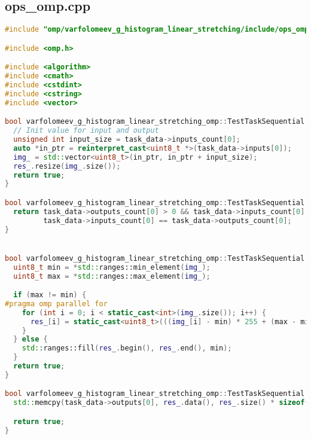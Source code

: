 \documentclass[a4paper,12pt]{article}
\begin{document}
\subsection{ops\_omp.cpp}
\begin{lstlisting}[language=C++,
    breaklines=true,       % Автоматический перенос строк
    basicstyle=\small\ttfamily, % Уменьшенный шрифт
    columns=fullflexible ]
    #include "omp/varfolomeev_g_histogram_linear_stretching/include/ops_omp.hpp"

#include <omp.h>

#include <algorithm>
#include <cmath>
#include <cstdint>
#include <cstring>
#include <vector>

bool varfolomeev_g_histogram_linear_stretching_omp::TestTaskSequential::PreProcessingImpl() {
  // Init value for input and output
  unsigned int input_size = task_data->inputs_count[0];
  auto *in_ptr = reinterpret_cast<uint8_t *>(task_data->inputs[0]);
  img_ = std::vector<uint8_t>(in_ptr, in_ptr + input_size);
  res_.resize(img_.size());
  return true;
}

bool varfolomeev_g_histogram_linear_stretching_omp::TestTaskSequential::ValidationImpl() {
  return task_data->outputs_count[0] > 0 && task_data->inputs_count[0] > 0 &&
         task_data->inputs_count[0] == task_data->outputs_count[0];
}


bool varfolomeev_g_histogram_linear_stretching_omp::TestTaskSequential::RunImpl() {
  uint8_t min = *std::ranges::min_element(img_);
  uint8_t max = *std::ranges::max_element(img_);

  if (max != min) {
#pragma omp parallel for
    for (int i = 0; i < static_cast<int>(img_.size()); i++) {
      res_[i] = static_cast<uint8_t>(((img_[i] - min) * 255 + (max - min) / 2) / (max - min));
    }
  } else {
    std::ranges::fill(res_.begin(), res_.end(), min);
  }
  return true;
}

bool varfolomeev_g_histogram_linear_stretching_omp::TestTaskSequential::PostProcessingImpl() {
  std::memcpy(task_data->outputs[0], res_.data(), res_.size() * sizeof(uint8_t));

  return true;
}
    \end{lstlisting}
\end{document}
